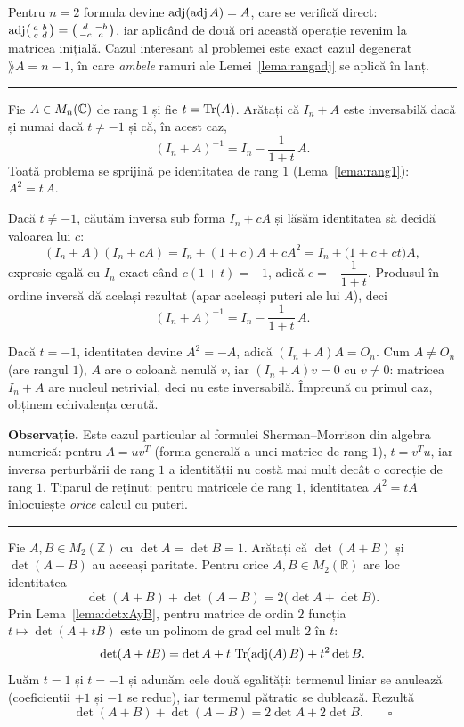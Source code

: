 \begin{obs}
Pentru $n = 2$ formula devine $\operatorname{adj}(\operatorname{adj} A) = A$, care se verifică direct: $\operatorname{adj}\bigl(\begin{smallmatrix} a & b \\ c & d \end{smallmatrix}\bigr) = \bigl(\begin{smallmatrix} d & -b \\ -c & a \end{smallmatrix}\bigr)$, iar aplicând de două ori această operație revenim la matricea inițială. Cazul interesant al problemei este exact cazul degenerat $\rang A = n-1$, în care \emph{ambele} ramuri ale Lemei~\ref{lema:rangadj} se aplică în lanț.
\end{obs}
\vspace{1mm}\hrule

Fie $A \in M_n(\mathbb{C})$ de rang $1$ și fie $t = \operatorname{Tr}(A)$. Arătați că $I_n + A$ este inversabilă dacă și numai dacă $t \neq -1$ și că, în acest caz,
\[
(I_n + A)^{-1} = I_n - \frac{1}{1+t}\,A.
\]
\sol Toată problema se sprijină pe identitatea de rang $1$ (Lema~\ref{lema:rang1}): $A^2 = t\,A$.

Dacă $t \neq -1$, căutăm inversa sub forma $I_n + cA$ și lăsăm identitatea să decidă valoarea lui $c$:
\[
(I_n + A)(I_n + cA) = I_n + (1+c)A + cA^2 = I_n + \bigl(1 + c + ct\bigr)A,
\]
expresie egală cu $I_n$ exact când $c(1+t) = -1$, adică $c = -\dfrac{1}{1+t}$. Produsul în ordine inversă dă același rezultat (apar aceleași puteri ale lui $A$), deci
\[
(I_n + A)^{-1} = I_n - \frac{1}{1+t}\,A.
\]

Dacă $t = -1$, identitatea devine $A^2 = -A$, adică $(I_n + A)A = O_n$. Cum $A \neq O_n$ (are rangul $1$), $A$ are o coloană nenulă $v$, iar $(I_n + A)v = 0$ cu $v \neq 0$: matricea $I_n + A$ are nucleul netrivial, deci nu este inversabilă. Împreună cu primul caz, obținem echivalența cerută.

\textbf{Observație.} Este cazul particular al formulei Sherman--Morrison din algebra numerică: pentru $A = uv^T$ (forma generală a unei matrice de rang $1$), $t = v^T u$, iar inversa perturbării de rang $1$ a identității nu costă mai mult decât o corecție de rang $1$. Tiparul de reținut: pentru matricele de rang $1$, identitatea $A^2 = tA$ înlocuiește \emph{orice} calcul cu puteri.
\vspace{1mm}\hrule

Fie $A,B\in M_2(\mathbb{Z})$ cu $\det A=\det B=1$. Arătați că $\det(A+B)$ și $\det(A-B)$ au aceeași paritate.
\lema
Pentru orice $A,B\in M_2(\mathbb{R})$ are loc identitatea
\[ \det(A+B)+\det(A-B)=2\bigl(\det A+\det B\bigr). \]
\demo Prin Lema~\ref{lema:detxAyB}, pentru matrice de ordin $2$ funcția $t\mapsto\det(A+tB)$ este un polinom de grad cel mult $2$ în $t$:
\[ \det(A+tB)=\det A+t\,\operatorname{Tr}\!\bigl(\operatorname{adj}(A)\,B\bigr)+t^2\det B. \]
Luăm $t=1$ și $t=-1$ și adunăm cele două egalități: termenul liniar se anulează (coeficienții $+1$ și $-1$ se reduc), iar termenul pătratic se dublează. Rezultă
\[ \det(A+B)+\det(A-B)=2\det A+2\det B. \qquad\square \]

